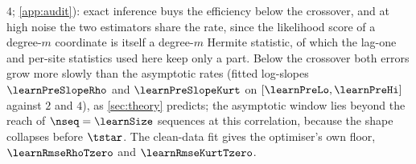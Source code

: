 $4$; \cref{app:audit}): exact inference buys the efficiency below the crossover, and at
high noise the two estimators share the rate, since the likelihood score of a degree-$m$
coordinate is itself a degree-$m$ Hermite statistic, of which the lag-one and per-site
statistics used here keep only a part. Below the crossover both errors
grow more slowly than the asymptotic rates (fitted log-slopes $\learnPreSlopeRho$ and
$\learnPreSlopeKurt$ on $[\learnPreLo,\learnPreHi]$ against $2$ and $4$), as
\cref{sec:theory} predicts; the asymptotic window lies beyond the reach of
$\nseq=\learnSize$ sequences at this correlation, because the shape collapses before
$\tstar$. The clean-data fit gives the optimiser's own floor, $\learnRmseRhoTzero$ and
$\learnRmseKurtTzero$.
